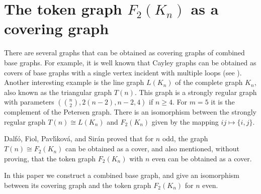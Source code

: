 \documentclass[letterpaper,10pt]{article}
\theoremstyle{plain}
\theoremstyle{definition}
\begin{document}
\section{The token graph $F_2({K_n})$ as a covering graph}
\label{sec:F2}

There are several graphs that can be obtained as covering graphs of combined base graphs. 
For example, it is well known that Cayley graphs can be obtained as covers of base graphs with a single vertex incident with multiple loops (see \cite{GT}). 
Another interesting example is the line graph $L(K_n)$ of the complete graph $K_{n}$, also known as the triangular graph $T(n)$.
This graph is a strongly regular graph with parameters $(\binom{n}{2},2(n-2),n-2,4)$ if $n\geq 4$. 
For $m = 5$ it is the complement of the Petersen graph.
There is an isomorphism between the strongly regular graph $T(n)\cong L(K_{n})$ and $F_2({K_n})$ given by the mapping $ij\mapsto \{i,j\}$.

Dalf{\'o}, Fiol, Pavl{\'\i}kov{\'a}, and Sir{\'a}n  \cite{DFP} proved that for $n$ odd, the graph $T(n) \cong F_2({K_n})$ can be obtained as a cover, and also mentioned, without proving, that the token graph $F_2(K_n)$ with $n$ even can be obtained as a cover.

In this paper we construct a combined base graph, and give an isomorphism between its covering graph and the token graph $F_2(K_n)$ for $n$ even. 
\end{document}
